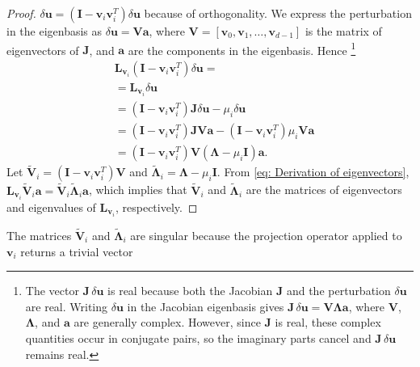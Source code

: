 \documentclass[aps,reprint,prx]{revtex4-2}
\begin{document}
\begin{proof}
$\delta\mathbf{u} = \left( \mathbf{I} - \mathbf{v}_i\mathbf{v}_i^T\right)\delta\mathbf{u}$ because of orthogonality. We express the perturbation in the eigenbasis as $\delta \mathbf{u} = \mathbf{V}\mathbf{a}$, where $\mathbf{V} = \left[\mathbf{v}_0, \mathbf{v}_1, \ldots, \mathbf{v}_{d-1} \right]$ is the matrix of eigenvectors of $\mathbf{J}$, and $\mathbf{a}$ are the components in the eigenbasis.
Hence \footnote{The vector $\mathbf{J}\,\delta\mathbf{u}$ is real because both the Jacobian $\mathbf{J}$ and the perturbation $\delta\mathbf{u}$ are real. Writing $\delta\mathbf{u}$ in the Jacobian eigenbasis gives $\mathbf{J}\,\delta\mathbf{u} = \mathbf{V}\mathbf{\Lambda}\mathbf{a}$, where $\mathbf{V}$, $\mathbf{\Lambda}$, and $\mathbf{a}$ are generally complex. However, since $\mathbf{J}$ is real, these complex quantities occur in conjugate pairs, so the imaginary parts cancel and $\mathbf{J}\,\delta\mathbf{u}$ remains real.}
\begin{align} \label{eq: Derivation of eigenvectors}
& \mathbf{L}_{\mathbf{v}_i}\left( \mathbf{I} - \mathbf{v}_i\mathbf{v}_i^T\right)\delta \mathbf{u} =\nonumber \\ &= \mathbf{L}_{\mathbf{v}_i} \delta\mathbf{u} \nonumber\\ &= \left( \mathbf{I} - \mathbf{v}_i\mathbf{v}_i^T\right)\mathbf{J}\delta \mathbf{u} - \mu_i \delta\mathbf{u} \nonumber\\
&= \left( \mathbf{I} - \mathbf{v}_i\mathbf{v}_i^T\right)\mathbf{J}\mathbf{Va} - \left( \mathbf{I} - \mathbf{v}_i\mathbf{v}_i^T\right)\mu_i \mathbf{Va} \nonumber\\
&= \left( \mathbf{I} - \mathbf{v}_i\mathbf{v}_i^T\right) \mathbf{V} \left(\mathbf{\Lambda} - \mu_i \mathbf{I} \right) \mathbf{a}.
\end{align}
Let $\widetilde{\mathbf{V}}_{i} = \left( \mathbf{I} - \mathbf{v}_i\mathbf{v}_i^T\right) \mathbf{V}$ and $\widetilde{\mathbf{\Lambda}}_{i} = \mathbf{\Lambda} - \mu_i \mathbf{I}$. From \eqref{eq: Derivation of eigenvectors}, $\mathbf{L}_{\mathbf{v}_i}\widetilde{\mathbf{V}}_{i}\mathbf{a} = \widetilde{\mathbf{V}}_{i}\widetilde{\mathbf{\Lambda}}_{i}\mathbf{a}$, which implies that $\widetilde{\mathbf{V}}_{i}$ and $\widetilde{\mathbf{\Lambda}}_{i}$ are the matrices of eigenvectors and eigenvalues of $\mathbf{L}_{\mathbf{v}_i}$, respectively.
\end{proof}



The matrices $\widetilde{\mathbf{V}}_i$ and $\widetilde{\mathbf{\Lambda}}_i$ are singular because the projection operator applied to $\mathbf{v}_i$ returns a trivial vector
\end{document}
